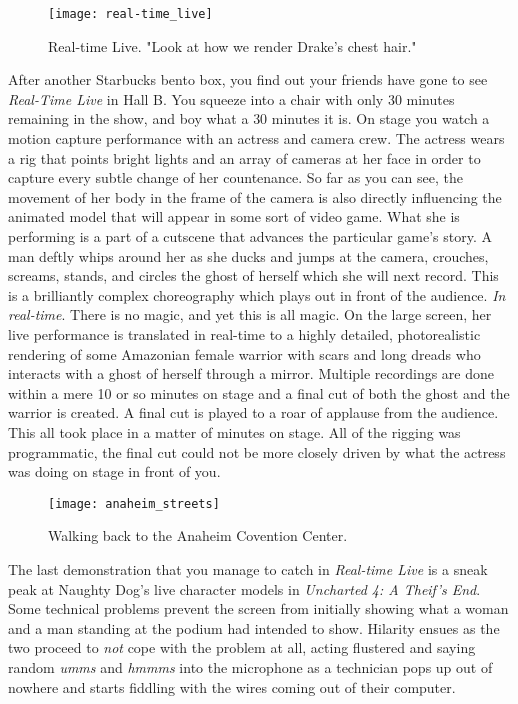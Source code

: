 \documentclass[../main.tex]{subfiles}
\begin{document}
\begin{figure}[h!]
	\centering
	\texttt{[image: real-time\_live]}
	\caption*{Real-time Live. "Look at how we render Drake's chest hair."}
\end{figure}

After another Starbucks bento box, you find out your friends have gone to see \textit{Real-Time Live} in Hall B. You squeeze into a chair with only 30 minutes remaining in the show, and boy what a 30 minutes it is. On stage you watch a motion capture performance with an actress and camera crew. The actress wears a rig that points bright lights and an array of cameras at her face in order to capture every subtle change of her countenance.  So far as you can see, the movement of her body in the frame of the camera is also directly influencing the animated model that will appear in some sort of video game. What she is performing is a part of a cutscene that advances the particular game's story. A man deftly whips around her as she ducks and jumps at the camera, crouches, screams, stands, and circles the ghost of herself which she will next record. This is a brilliantly complex choreography which plays out in front of the audience. \textit{In real-time}. There is no magic, and yet this is all magic. On the large screen, her live performance is translated in real-time to a highly detailed, photorealistic rendering of some Amazonian female warrior with scars and long dreads who interacts with a ghost of herself through a mirror. Multiple recordings are done within a mere 10 or so minutes on stage and a final cut of both the ghost and the warrior is created. A final cut is played to a roar of applause from the audience. This all took place in a matter of minutes on stage. All of the rigging was programmatic, the final cut could not be more closely driven by what the actress was doing on stage in front of you.

\begin{figure}[h!]
	\centering
	\texttt{[image: anaheim\_streets]}
	\caption*{Walking back to the Anaheim Covention Center.}
\end{figure}


The last demonstration that you manage to catch in \textit{Real-time Live} is a sneak peak at Naughty Dog's live character models in \textit{Uncharted 4: A Theif's End}. Some technical problems prevent the screen from initially showing what a woman and a man standing at the podium had intended to show. Hilarity ensues as the two proceed to \textit{not} cope with the problem at all, acting flustered and saying random \textit{umms} and \textit{hmmms} into the microphone as a technician pops up out of nowhere and starts fiddling with the wires coming out of their computer. 
\end{document}
